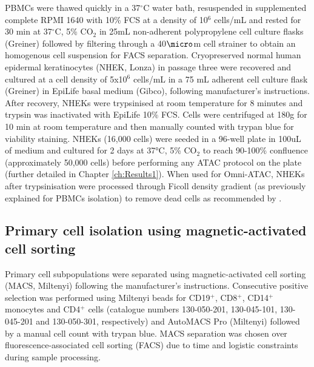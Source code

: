 PBMCs were thawed quickly in a 37{$^\circ$}C water bath, resuspended in supplemented complete RPMI 1640 with 10\% FCS at a density of 10$^6$ cells/mL and rested for 30 min at 37{$^\circ$}C, 5\% CO$_2$ in 25mL non-adherent polypropylene cell culture flasks (Greiner) followed by filtering through a 40$\micro$m cell strainer to obtain an homogenous cell suspension for FACS separation.
Cryopreserved normal human epidermal keratinocytes (NHEK, Lonza) in passage three were recovered and cultured at a cell density of 5x10$^6$ cells/mL in a 75 mL adherent cell culture flask (Greiner) in EpiLife basal medium (Gibco), following manufacturer's instructions. After recovery, NHEKs were trypsinised at room temperature for 8 minutes and trypsin was inactivated with EpiLife 10\% FCS. Cells were centrifuged at 180g for 10 min at room temperature and then manually counted with trypan blue for viability staining. NHEKs (16,000 cells) were seeded in a 96-well plate in 100uL of medium and cultured for 2 days at 37°C, 5\% CO$_2$ to reach 90-100\% confluence (approximately 50,000 cells) before performing any ATAC protocol on the plate (further detailed in Chapter \ref{ch:Results1}). When used for Omni-ATAC, NHEKs after trypsinisation were processed through Ficoll density gradient (as previously explained for PBMCs isolation) to remove dead cells as recommended by \parencite{Corces2017}.




\subsection{Primary cell isolation using magnetic-activated cell sorting}
Primary cell subpopulations were separated using magnetic-activated cell sorting (MACS, Miltenyi) following the manufacturer's instructions. Consecutive positive selection was performed using Miltenyi beads for CD19$^+$, CD8$^+$, CD14$^+$ monocytes and CD4$^+$ cells (catalogue numbers 130-050-201, 130-045-101, 130-045-201 and 130-050-301, respectively) and AutoMACS Pro (Miltenyi) followed by a manual cell count with trypan blue. MACS separation was chosen over fluorescence-associated cell sorting (FACS) due to time and logistic constraints during sample processing.

